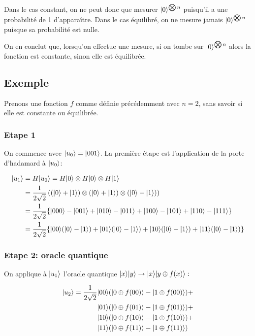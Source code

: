 \documentclass[12pt,a4paper]{article}
\DeclarePairedDelimiter\ket{\lvert}{\rangle}
\begin{document}
Dans le cas constant, on ne peut donc que mesurer $\ket{0}^{\bigotimes n}$ puisqu'il a une probabilité de 1 d'apparaître. Dans le cas équilibré, on ne mesure jamais $\ket{0}^{\bigotimes n}$ puisque sa probabilité est nulle.

On en conclut que, lorsqu'on effectue une mesure, si on tombe sur $\ket{0}^{\bigotimes n}$ alors la fonction est constante, sinon elle est équilibrée.


\subsection{Exemple}

Prenons une fonction $f$ comme définie précédemment avec $n=2$, sans
savoir si elle est constante ou équilibrée.

\subsubsection{Etape 1}


On commence avec $\ket{u_0} = \ket{001}$. La première étape est
l'application de la porte d'hadamard à $\ket{u_0}$:

\begin{align}
\ket{u_1} &= H\ket{u_0} = H\ket{0} \otimes H\ket{0} \otimes H\ket{1} \\
& = \frac{1}{2\sqrt{2}} \left( (\ket{0} + \ket{1})\otimes(\ket{0} + \ket{1})\otimes(\ket{0} - \ket{1}) \right) \\
 & = \frac{1}{2\sqrt{2}}\{\ket{000} - \ket{001} + \ket{010} - \ket{011} + \ket{100} - \ket{101} + \ket{110} - \ket{111}\} \\
& = \frac{1}{2\sqrt{2}}\{\ket{00}(\ket{0} - \ket{1}) + \ket{01}(\ket{0} - \ket{1}) + \ket{10}(\ket{0} - \ket{1}) + \ket{11}(\ket{0} - \ket{1})\}
\end{align}


\subsubsection{Etape 2: oracle quantique}

On applique à $\ket{u_1}$ l'oracle quantique $\ket{x}\ket{y}\rightarrow\ket{x}\ket{y\oplus f(x)}:$

\begin{align*}
\ket{u_2}  =  \frac{1}{2\sqrt{2}}  & \ket{00}(\ket{0 \oplus f(00)} - \ket{1 \oplus f(00)}) + \\
& \ket{01}(\ket{0 \oplus f(01)} - \ket{1 \oplus f(01)}) + \\
& \ket{10}(\ket{0 \oplus f(10)} - \ket{1 \oplus f(10)}) + \\
& \ket{11}(\ket{0 \oplus f(11)} - \ket{1 \oplus f(11)})  \\
\end{align*}
\end{document}
